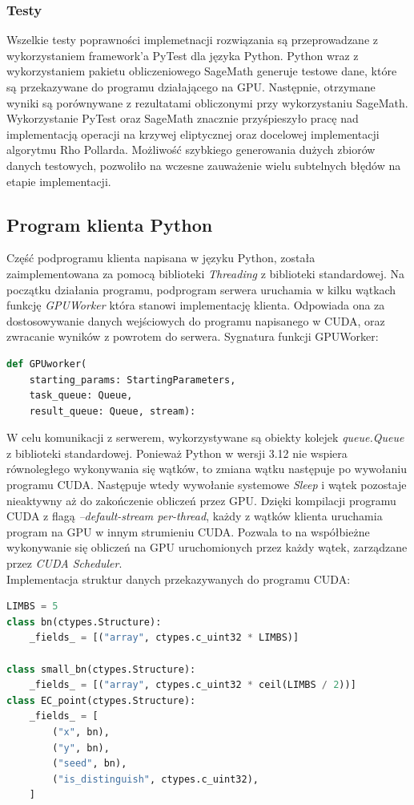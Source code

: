 \subsubsection{Testy}
Wszelkie testy poprawności implemetnacji rozwiązania są przeprowadzane z wykorzystaniem framework'a PyTest dla języka Python.
Python wraz z wykorzystaniem pakietu obliczeniowego SageMath generuje testowe dane, które
są przekazywane do programu działającego na GPU. Następnie, otrzymane wyniki są porównywane z rezultatami
obliczonymi przy wykorzystaniu SageMath. Wykorzystanie PyTest oraz SageMath znacznie przyśpieszyło pracę
nad implementacją operacji na krzywej eliptycznej oraz docelowej implementacji algorytmu Rho Pollarda.
Możliwość szybkiego generowania dużych zbiorów danych testowych, pozwoliło na wczesne zauważenie wielu subtelnych błędów
na etapie implementacji.


\subsection{Program klienta Python}
Część podprogramu klienta napisana w języku Python, została zaimplementowana
za pomocą biblioteki \textit{Threading} z biblioteki standardowej.
Na początku działania programu, podprogram serwera uruchamia w kilku wątkach
funkcję \textit{GPUWorker} która stanowi implementację klienta.
Odpowiada ona za
dostosowywanie danych wejściowych do programu napisanego w CUDA, oraz
zwracanie wyników z powrotem do serwera. Sygnatura funkcji GPUWorker:

\begin{lstlisting}[language=Python]
def GPUworker(
    starting_params: StartingParameters,
    task_queue: Queue,
    result_queue: Queue, stream):
\end{lstlisting}

W celu komunikacji z serwerem, wykorzystywane są obiekty kolejek
\textit{queue.Queue} z biblioteki standardowej.
Ponieważ Python w wersji 3.12 nie wspiera równoległego wykonywania
się wątków, to zmiana wątku następuje po wywołaniu programu CUDA.
Następuje wtedy wywołanie systemowe \textit{Sleep} i wątek pozostaje nieaktywny
aż do zakończenie obliczeń przez GPU.
Dzięki kompilacji programu CUDA z flagą \textit{--default-stream per-thread},
każdy z wątków klienta uruchamia program na GPU w innym strumieniu CUDA. Pozwala
to na współbieżne wykonywanie się obliczeń na GPU uruchomionych przez każdy wątek, zarządzane przez
\textit{CUDA Scheduler}. \\
Implementacja struktur danych przekazywanych do programu CUDA:
\begin{lstlisting}[language=Python]
LIMBS = 5
class bn(ctypes.Structure):
    _fields_ = [("array", ctypes.c_uint32 * LIMBS)]

class small_bn(ctypes.Structure):
    _fields_ = [("array", ctypes.c_uint32 * ceil(LIMBS / 2))]
class EC_point(ctypes.Structure):
    _fields_ = [
        ("x", bn),
        ("y", bn),
        ("seed", bn),
        ("is_distinguish", ctypes.c_uint32),
    ]
\end{lstlisting}

